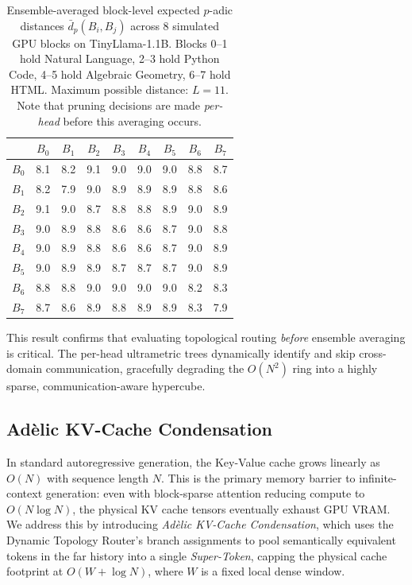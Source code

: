 \documentclass[11pt,a4paper]{article}
\begin{document}
\begin{table}[h]
\centering
\caption{Ensemble-averaged block-level expected $p$-adic distances $\bar{d}_p(B_i, B_j)$ across 8 simulated GPU blocks on TinyLlama-1.1B. Blocks 0--1 hold Natural Language, 2--3 hold Python Code, 4--5 hold Algebraic Geometry, 6--7 hold HTML. Maximum possible distance: $L = 11$. Note that pruning decisions are made \emph{per-head} before this averaging occurs.}
\label{tab:ring_distances}
\begin{tabular}{@{}r|cccccccc@{}}
\toprule
 & $B_0$ & $B_1$ & $B_2$ & $B_3$ & $B_4$ & $B_5$ & $B_6$ & $B_7$ \\
\midrule
$B_0$ & 8.1 & 8.2 & 9.1 & 9.0 & 9.0 & 9.0 & 8.8 & 8.7 \\
$B_1$ & 8.2 & 7.9 & 9.0 & 8.9 & 8.9 & 8.9 & 8.8 & 8.6 \\
$B_2$ & 9.1 & 9.0 & 8.7 & 8.8 & 8.8 & 8.9 & 9.0 & 8.9 \\
$B_3$ & 9.0 & 8.9 & 8.8 & 8.6 & 8.6 & 8.7 & 9.0 & 8.8 \\
$B_4$ & 9.0 & 8.9 & 8.8 & 8.6 & 8.6 & 8.7 & 9.0 & 8.9 \\
$B_5$ & 9.0 & 8.9 & 8.9 & 8.7 & 8.7 & 8.7 & 9.0 & 8.9 \\
$B_6$ & 8.8 & 8.8 & 9.0 & 9.0 & 9.0 & 9.0 & 8.2 & 8.3 \\
$B_7$ & 8.7 & 8.6 & 8.9 & 8.8 & 8.9 & 8.9 & 8.3 & 7.9 \\
\bottomrule
\end{tabular}
\end{table}

This result confirms that evaluating topological routing \emph{before} ensemble averaging is critical. The per-head ultrametric trees dynamically identify and skip cross-domain communication, gracefully degrading the $O(N^2)$ ring into a highly sparse, communication-aware hypercube.

\subsection{Adèlic KV-Cache Condensation}
\label{sec:kv_cache}

In standard autoregressive generation, the Key-Value cache grows linearly as $O(N)$ with sequence length $N$. This is the primary memory barrier to infinite-context generation: even with block-sparse attention reducing compute to $O(N \log N)$, the physical KV cache tensors eventually exhaust GPU VRAM. We address this by introducing \emph{Adèlic KV-Cache Condensation}, which uses the Dynamic Topology Router's branch assignments to pool semantically equivalent tokens in the far history into a single \emph{Super-Token}, capping the physical cache footprint at $O(W + \log N)$, where $W$ is a fixed local dense window.
\end{document}
